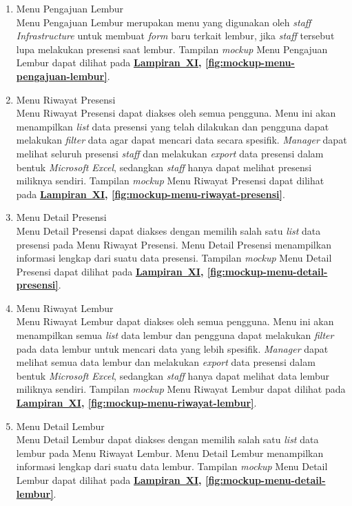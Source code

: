 \begin{enumerate}
    \item Menu Pengajuan Lembur
    \\ Menu Pengajuan Lembur merupakan menu yang digunakan oleh \textit{staff Infrastructure} untuk membuat \textit{form} baru terkait lembur, jika \textit{staff} tersebut lupa melakukan presensi saat lembur. Tampilan \textit{mockup} Menu Pengajuan Lembur dapat dilihat pada \textbf{\hyperref[sec:mockup-aplikasi-presensi-online]{Lampiran~XI}, \ref{fig:mockup-menu-pengajuan-lembur}}.

    \item Menu Riwayat Presensi
    \\ Menu Riwayat Presensi dapat diakses oleh semua pengguna. Menu ini akan menampilkan \textit{list} data presensi yang telah dilakukan dan pengguna dapat melakukan \textit{filter} data agar dapat mencari data secara spesifik. \textit{Manager} dapat melihat seluruh presensi \textit{staff} dan melakukan \textit{export} data presensi dalam bentuk \textit{Microsoft Excel}, sedangkan \textit{staff} hanya dapat melihat presensi miliknya sendiri. Tampilan \textit{mockup} Menu Riwayat Presensi dapat dilihat pada \textbf{\hyperref[sec:mockup-aplikasi-presensi-online]{Lampiran~XI}, \ref{fig:mockup-menu-riwayat-presensi}}.

    \item Menu Detail Presensi
    \\ Menu Detail Presensi dapat diakses dengan memilih salah satu \textit{list} data presensi pada Menu Riwayat Presensi. Menu Detail Presensi menampilkan informasi lengkap dari suatu data presensi. Tampilan \textit{mockup} Menu Detail Presensi dapat dilihat pada \textbf{\hyperref[sec:mockup-aplikasi-presensi-online]{Lampiran~XI}, \ref{fig:mockup-menu-detail-presensi}}.

    \item Menu Riwayat Lembur
    \\ Menu Riwayat Lembur dapat diakses oleh semua pengguna. Menu ini akan menampilkan semua \textit{list} data lembur dan pengguna dapat melakukan \textit{filter} pada data lembur untuk mencari data yang lebih spesifik. \textit{Manager} dapat melihat semua data lembur dan melakukan \textit{export} data presensi dalam bentuk \textit{Microsoft Excel}, sedangkan \textit{staff} hanya dapat melihat data lembur miliknya sendiri. Tampilan \textit{mockup} Menu Riwayat Lembur dapat dilihat pada \textbf{\hyperref[sec:mockup-aplikasi-presensi-online]{Lampiran~XI}, \ref{fig:mockup-menu-riwayat-lembur}}.

    \item Menu Detail Lembur
    \\ Menu Detail Lembur dapat diakses dengan memilih salah satu \textit{list} data lembur pada Menu Riwayat Lembur. Menu Detail Lembur menampilkan informasi lengkap dari suatu data lembur. Tampilan \textit{mockup} Menu Detail Lembur dapat dilihat pada \textbf{\hyperref[sec:mockup-aplikasi-presensi-online]{Lampiran~XI}, \ref{fig:mockup-menu-detail-lembur}}.


\end{enumerate}
